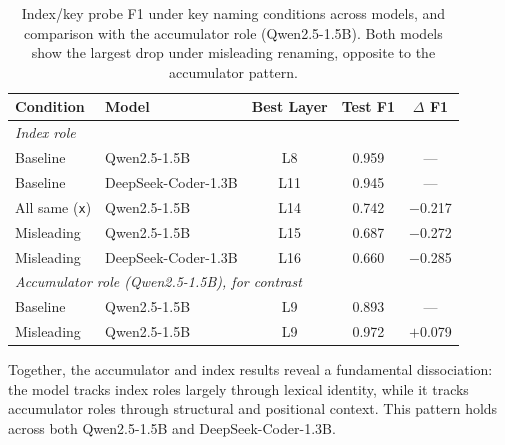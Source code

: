\begin{table}[t]
\centering
\caption{Index/key probe F1 under key naming conditions across models, and
comparison with the accumulator role (Qwen2.5-1.5B). Both models show the
largest drop under misleading renaming, opposite to the accumulator pattern.}
\label{tab:index-renaming}
\begin{tabular}{llccc}
\toprule
Condition & Model & Best Layer & Test F1 & $\Delta$ F1 \\
\midrule
\multicolumn{5}{l}{\textit{Index role}} \\
Baseline          & Qwen2.5-1.5B        & L8  & 0.959 & ---      \\
Baseline          & DeepSeek-Coder-1.3B & L11 & 0.945 & ---      \\
All same (\texttt{x}) & Qwen2.5-1.5B   & L14 & 0.742 & $-$0.217 \\
Misleading        & Qwen2.5-1.5B        & L15 & 0.687 & $-$0.272 \\
Misleading        & DeepSeek-Coder-1.3B & L16 & 0.660 & $-$0.285 \\
\midrule
\multicolumn{5}{l}{\textit{Accumulator role (Qwen2.5-1.5B), for contrast}} \\
Baseline          & Qwen2.5-1.5B        & L9  & 0.893 & ---      \\
Misleading        & Qwen2.5-1.5B        & L9  & 0.972 & $+$0.079 \\
\bottomrule
\end{tabular}
\end{table}

Together, the accumulator and index results reveal a fundamental dissociation:
the model tracks index roles largely through lexical identity, while it tracks
accumulator roles through structural and positional context. This pattern holds
across both Qwen2.5-1.5B and DeepSeek-Coder-1.3B.

